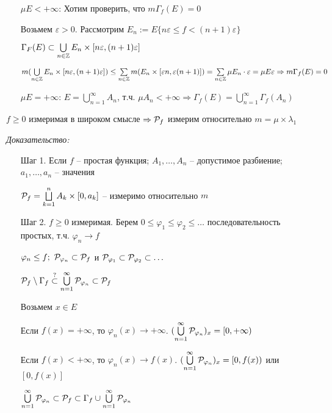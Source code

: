 \documentclass[12pt]{article}
\begin{document}
\begin{itemize}
    \item[$\mu E < + \infty$: ] Хотим проверить, что $m\Gamma_f(E) = 0$
    
    Возьмем $\varepsilon > 0$. Рассмотрим $E_n := E\{n\varepsilon \leq f < (n + 1)\varepsilon\}$

    $\Gamma_F(E) \subset \bigcup\limits_{n \in \Z} E_n \times [n\varepsilon, (n + 1)\varepsilon]$

    $m(\bigcup\limits_{n \in \Z} E_n \times [n\varepsilon, (n + 1)\varepsilon]) \leq \sum\limits_{n \in \Z} m(E_n \times [\varepsilon n, \varepsilon(n + 1)]) = \sum\limits_{n \in \Z} \mu E_n \cdot \varepsilon = \mu E \varepsilon \Rightarrow m\Gamma_f(E) = 0$

    \item[$\mu E = + \infty$: ] $E = \bigcup\limits_{n = 1}^\infty A_n$, т.ч. $\mu A_n < + \infty \Rightarrow \Gamma_f(E) = \bigcup\limits_{n = 1}^\infty \Gamma_f(A_n)$
\end{itemize}

\begin{lem}{}
    $f \geq 0$ измеримая в широком смысле $\Rightarrow \P_f$ измерим относительно $m = \mu \times \lambda_1$
\end{lem}

\textit{Доказательство:}

\begin{enumerate}
    \item[Шаг 1. ] Если $f$ -- простая функция; $A_1, \ldots, A_n$ -- допустимое разбиение; $a_1, \ldots, a_n$ -- значения 
    
    $\P_f = \bigsqcup\limits_{k = 1}^n A_k \times [0, a_k]$ -- измеримо относительно $m$

    \item[Шаг 2. ] $f \geq 0$ измеримая. Берем $0 \leq \varphi_1 \leq \varphi_2 \leq \ldots$ последовательность простых, т.ч. $\varphi_n \to f$
    
    $\varphi_n \leq f;\ \P_{\varphi_n} \subset \P_f$ и $\P_{\varphi_1} \subset \P_{\varphi_2} \subset \ldots$

    $\P_f \setminus \Gamma_f \stackrel{?}{\subset} \bigcup\limits_{n = 1}^\infty \P_{\varphi_n} \subset \P_f$

    Возьмем $x \in E$
    
    Если $f(x) = + \infty$, то $\varphi_n(x) \to + \infty$. $(\bigcup\limits_{n = 1}^\infty \P_{\varphi_n})_x = [0, + \infty)$

    Если $f(x) < + \infty$, то $\varphi_n(x) \to f(x)$. $(\bigcup\limits_{n = 1}^\infty \P_{\varphi_n})_x = [0, f(x))$ или $[0, f(x)]$

    $\bigcup\limits_{n = 1}^\infty \P_{\varphi_n} \subset \P_f \subset \Gamma_f \cup \bigcup\limits_{n = 1}^\infty \P_{\varphi_n}$
\end{enumerate}
\end{document}
